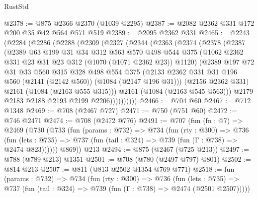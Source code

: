 \begin{lexlean}{RustStd}
\begin{coremodule}
@2378 := @875 @2366 @2370 (@1039 @2295)
@2387 := @2082 @2362 @331 @172 @200 @35 @42 @564 @571 @519
@2389 := @2095 @2362 @331
@2465 := @2243
    (@2284
      (@2286
        (@2288
          (@2309
            (@2327
              (@2344
                (@2363
                  (@2374
                    (@2378
                      (@2387
                        (@2389
                          @63
                          @199
                          @31
                          @34
                          @312
                          @563
                          @570
                          @498
                          @544
                          @375
                          (@1062 @2362 @331 @23 @31 @23 @312 (@1070 (@1071 @2362 @23)) @1120)
                          (@2389
                            @197
                            @72
                            @31
                            @33
                            @560
                            @315
                            @328
                            @498
                            @554
                            @375
                            (@2133
                              @2362
                              @331
                              @31
                              @196
                              @560
                              (@2141 (@2142 @560))
                              (@1084 (@2147 @196 @31)))
                            (@2156 @2362 @331)
                            @2161
                            (@1084 (@2163 @555 @315)))
                          @2161
                          (@1084 (@2163 @545 @563)))
                        @2179
                        @2183
                        @2188
                        @2193
                        @2199
                        @2206))))))))))
@2466 := @704 @60
@2467 := @712 @1348
@2469 := @708 (@2467 @727)
@2471 := @750 (@751 @60)
@2472 := @746 @2471
@2474 := @708 (@2472 @776)
@2491 := @707
    (fun (fn : @7) =>
    @2469
      (@730
        (@733
          (fun (params : @732) =>
          @734
            (fun (rty : @300) =>
            @736
              (fun (lets : @735) =>
              @737 (fun (tail : @324) => @739 (fun (Γ : @738) => @2474 @823))))))
        @869))
    @213
@2494 := @875 (@2467 (@725 @213))
@2497 := @788 (@789 @213) @1351
@2501 := @708 (@780 (@2497 @797) @801)
@2502 := @814 @213
@2507 := @811 (@813 @2502 @1354 @769 @771)
@2518 := fun (params : @732) =>
  @734
    (fun (rty : @300) =>
    @736
      (fun (lets : @735) =>
      @737 (fun (tail : @324) => @739 (fun (Γ : @738) => @2474 (@2501 @2507)))))

\end{coremodule}
\end{lexlean}

